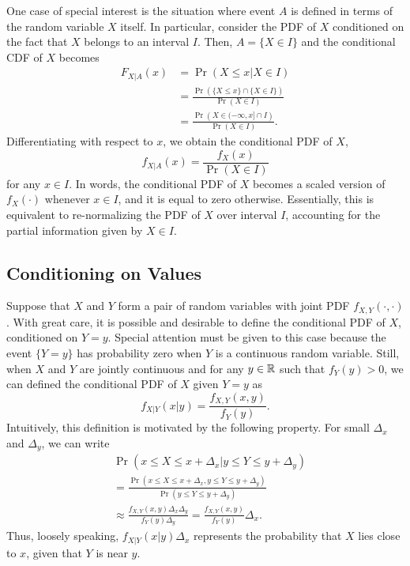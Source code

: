 One case of special interest is the situation where event $A$ is defined in terms of the random variable $X$ itself.
In particular, consider the PDF of $X$ conditioned on the fact that $X$ belongs to an interval $I$.
Then, $A = \{ X \in I \}$ and the conditional CDF of $X$ becomes
\begin{equation*}
\begin{split}
F_{X|A} (x) &= \Pr (X \leq x | X \in I) \\
&= \frac{ \Pr \left( \{ X \leq x \} \cap \{ X \in I \} \right) }{\Pr(X \in I)} \\
&= \frac{ \Pr \left( X \in (-\infty, x] \cap I \right) }{\Pr(X \in I)} .
\end{split}
\end{equation*}
Differentiating with respect to $x$, we obtain the conditional PDF of $X$,
\begin{equation*}
f_{X|A} (x) = \frac{ f_X (x) }{ \Pr (X \in I) } 
\end{equation*}
for any $x \in I$.
In words, the conditional PDF of $X$ becomes a scaled version of $f_X(\cdot)$ whenever $x \in I$, and it is equal to zero otherwise.
Essentially, this is equivalent to re-normalizing the PDF of $X$ over interval $I$, accounting for the partial information given by $X \in I$.


\subsection{Conditioning on Values}

Suppose that $X$ and $Y$ form a pair of random variables with joint PDF $f_{X,Y} (\cdot, \cdot)$.
With great care, it is possible and desirable to define the conditional PDF of $X$, conditioned on $Y = y$. 
Special attention must be given to this case because the event $\{ Y = y \}$ has probability zero when $Y$ is a continuous random variable.
Still, when $X$ and $Y$ are jointly continuous and for any $y \in \mathbb{R}$ such that $f_Y (y) > 0$, we can defined the conditional PDF of $X$ given $Y = y$ as
\begin{equation} \label{equation:ConditionalPDF}
f_{X|Y} (x|y) = \frac{ f_{X,Y} (x,y) }{ f_Y (y) } .
\end{equation}
Intuitively, this definition is motivated by the following property.
For small $\Delta_x$ and $\Delta_y$, we can write
\begin{equation*}
\begin{split}
&\Pr (x \leq X \leq x + \Delta_x | y \leq Y \leq y + \Delta_y) \\
&= \frac{\Pr (x \leq X \leq x + \Delta_x, y \leq Y \leq y + \Delta_y)}
{\Pr (y \leq Y \leq y + \Delta_y)} \\
&\approx \frac{f_{X,Y} (x, y) \Delta_x \Delta_y} {f_Y (y) \Delta_y}
= \frac{f_{X,Y} (x, y)}{f_Y (y)} \Delta_x .
\end{split}
\end{equation*}
Thus, loosely speaking, $f_{X|Y} (x|y) \Delta_x$ represents the probability that $X$ lies close to $x$, given that $Y$ is near $y$.

